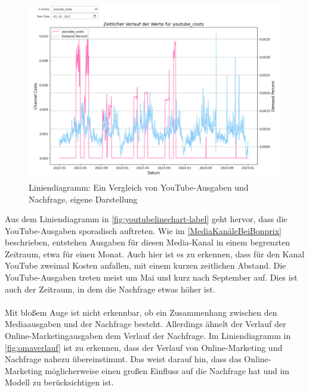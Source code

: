 \begin{figure}[ht]
    \centering
    \includegraphics[width=0.98\linewidth]{images/youtubeLineChart.png}
    \caption{Liniendiagramm: Ein Vergleich von YouTube-Ausgaben und Nachfrage, eigene Darstellung}
    \label{fig:youtubelinechart-label}
\end{figure}
\noindent
Aus dem Liniendiagramm in \autoref{fig:youtubelinechart-label} geht hervor, dass die YouTube-Ausgaben sporadisch auftreten. Wie im \autoref{MediaKanäleBeiBonprix} beschrieben, entstehen Ausgaben für diesen Media-Kanal in einem begrenzten Zeitraum, etwa für einen Monat. Auch hier ist es zu erkennen, dass für den Kanal YouTube zweimal Kosten anfallen, mit einem kurzen zeitlichen Abstand. Die YouTube-Ausgaben treten meist um Mai und kurz nach September auf. Dies ist auch der Zeitraum, in dem die Nachfrage etwas höher ist. \\\\
Mit bloßem Auge ist nicht erkennbar, ob ein Zusammenhang zwischen den Mediaausgaben und der Nachfrage besteht. Allerdings ähnelt der Verlauf der Online-Marketingausgaben dem Verlauf der Nachfrage. Im Liniendiagramm in \autoref{fig:omaverlauf} ist zu erkennen, dass der Verlauf von Online-Marketing und Nachfrage nahezu übereinstimmt. Das weist darauf hin, dass das Online-Marketing möglicherweise einen großen Einfluss auf die Nachfrage hat und im Modell zu berücksichtigen ist.
